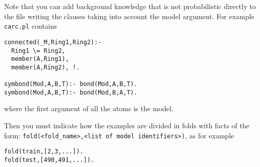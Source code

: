 \documentclass[a4paper,10pt]{article}
\begin{document}
Note that you can add background knowledge that is not probabilistic directly to the file writing the clauses taking into account the model argument. For example \verb|carc.pl|
contains

\begin{verbatim}
connected(_M,Ring1,Ring2):-
  Ring1 \= Ring2,
  member(A,Ring1),
  member(A,Ring2), !.

symbond(Mod,A,B,T):- bond(Mod,A,B,T).
symbond(Mod,A,B,T):- bond(Mod,B,A,T).
\end{verbatim}
where the first argument of all the atoms is the model.

Then you must indicate how the examples are divided in folds with facts of the form:
\verb|fold(<fold_name>,<list of model identifiers>)|, as for example
\begin{verbatim}
fold(train,[2,3,...]).
fold(test,[490,491,...]).
\end{verbatim}
\end{document}
